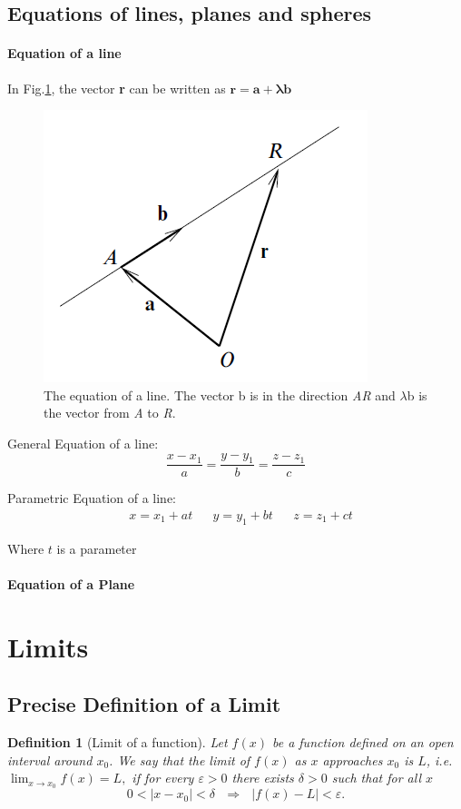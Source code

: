 \documentclass[12pt]{article}
\newtheorem{defn}{Definition}
\begin{document}
\subsection{Equations of lines, planes and spheres}

\paragraph{Equation of a line}
In Fig.\ref{eqnline}, the vector {\bfseries r} can be written as $\mathbf{r} = \mathbf{a + \lambda b}$
\begin{figure}[H]
	\centering
	\includegraphics[scale=0.75]{figures/line}
	\caption{\label{eqnline} The equation of a line. The vector b is in the direction \emph{AR} and $\mathcal{\lambda}$b is the vector from \emph{A} to \emph{R}.}
\end{figure}
General Equation of a line:
$$\frac{x-x_1}{a} = \frac{y- y_1}{b} = \frac{z-z_1}{c}$$

Parametric Equation of a line:
\begin{align*}
	&x = x_1 + at & &y= y_1 +bt & &z= z_1 +ct
\end{align*}

Where $t$ is a parameter
\paragraph{Equation of a Plane}

\section{Limits}
\subsection{Precise Definition of a Limit}
\begin{defn}[Limit of a function]
	Let $f(x)$ be a function defined on an open interval around $x_0$. We say that the limit of $f(x)$ as $x$ approaches $x_0$ is $L$, i.e.
	$\lim _{ x \to x_{0} }{f(x) } = L,$	if for every $\varepsilon > 0 $ there exists $\delta >0$ such that for all $x$
	$$0 < \left| x - x_{0} \right |<\delta \textrm{ } \Rightarrow \textrm{ } \left |f(x) - L \right| < \varepsilon.$$
\end{defn}
\end{document}
